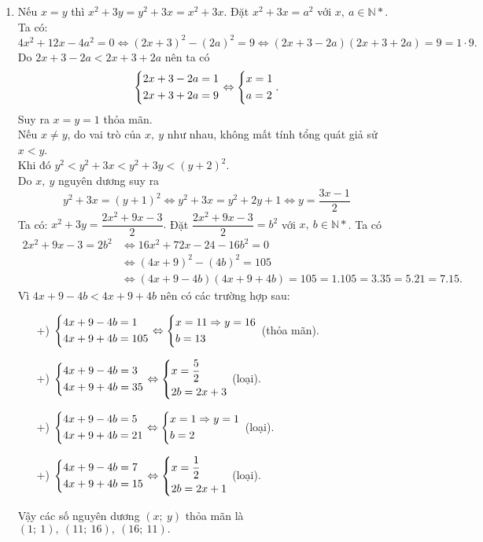 \begin{ex}
{\begin{enumerate}
        \item Nếu $x = y$ thì $x^2+3y=y^2+3x=x^2+3x$. Đặt $x^2+3x=a^2$ với $x,\ a\in \mathbb{N}*$.\\
Ta có: $$4x^2+12x-4a^2=0\Leftrightarrow (2x+3)^2-(2a)^2=9\Leftrightarrow (2x+3-2a)(2x+3+2a)=9= 1\cdot 9.$$
Do $ 2x+3-2a<2x+3+2a$ nên ta có $$\left\{\begin{aligned}  & 2x+3-2a=1 \\  & 2x+3+2a=9 \end{aligned}\right. \Leftrightarrow \left\{\begin{aligned}  & x=1 \\  & a=2 \end{aligned}\right..$$
Suy ra $x = y = 1$ thỏa mãn.\\
Nếu $x \ne y$, do vai trò của $x,\ y$ như nhau, không mất tính tổng quát giả sử $x < y$.\\
Khi đó $y^2<y^2+3x<y^2+3y<(y+2)^2$.\\
Do $x,\ y$ nguyên dương suy ra $$y^2+3x=(y+1)^2 \Leftrightarrow y^2+3x=y^2+2y+1\Leftrightarrow y=\dfrac{3x-1}{2}$$
Ta có: $x^2+3y=\dfrac{2x^2+9x-3}{2}.$ Đặt $\dfrac{2x^2+9x-3}{2}=b^2$   với $x,\ b\in \mathbb{N}*$. Ta có 
$$ \begin{aligned} 2x^2+9x-3=2b^2& \Leftrightarrow 16x^2+72x-24-16b^2=0\\&
\Leftrightarrow (4x+9)^2-(4b)^2=105\\& \Leftrightarrow (4x+9-4b)(4x+9+4b)=105=1.105=3.35=5.21=7.15 .\end{aligned}$$
Vì $ 4x+9-4b<4x+9+4b$ nên có các trường hợp sau:
\begin{itemize}
\item[+)] $ \left\{\begin{aligned}  & 4x+9-4b=1 \\  & 4x+9+4b=105 \end{aligned}\right.\Leftrightarrow \left\{\begin{aligned}  & x=11\Rightarrow y=16 \\  & b=13 \end{aligned}\right.$ (thỏa mãn).
\item[+)] $\left\{\begin{aligned}   & 4x+9-4b=3 \\  & 4x+9+4b=35\end{aligned}\right. \Leftrightarrow \left\{\begin{aligned}   & x=\dfrac{5}{2} \\ 
 & 2b=2x+3 \end{aligned}\right.$ (loại).
\item[+)] $\left\{\begin{aligned}  & 4x+9-4b=5 \\  & 4x+9+4b=21\end{aligned}\right.
\Leftrightarrow \left\{\begin{aligned}   & x=1\Rightarrow y=1 \\  & b=2 \end{aligned}\right.$ (loại).
\item[+)] $\left\{\begin{aligned}  & 4x+9-4b=7 \\  & 4x+9+4b=15 \end{aligned}\right.\Leftrightarrow \left\{\begin{aligned}   & x=\dfrac{1}{2} \\ 
 & 2b=2x+1 \end{aligned}\right.$ (loại).
\end{itemize}
Vậy các số nguyên dương $(x;\ y)$ thỏa mãn là $(1;\ 1),\  (11;\ 16),\ (16;\ 11).$ 
    \end{enumerate}
    }
\end{ex}


